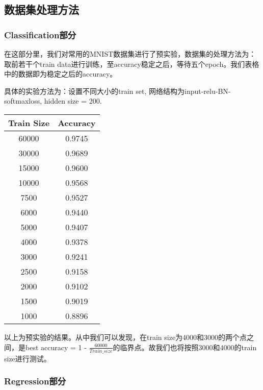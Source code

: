 \documentclass{article}
\begin{document}
\subsection{数据集处理方法}

\subsubsection{Classification部分}

在这部分里，我们对常用的MNIST数据集进行了预实验，数据集的处理方法为：取前若干个train data进行训练，至accuracy稳定之后，等待五个epoch。我们表格中的数据即为稳定之后的accuracy。

具体的实验方法为：设置不同大小的train set, 网络结构为input-relu-BN-softmaxloss, hidden size = 200.

\begin{center}
    \begin{tabular}{|c|c|}
        \hline
        Train Size & Accuracy \\
        \hline
        60000 & 0.9745 \\
        \hline
        30000 & 0.9689 \\
        \hline
        15000 & 0.9600 \\
        \hline
        10000 & 0.9568 \\
        \hline
        7500 & 0.9527 \\
        \hline
        6000 & 0.9440 \\
        \hline
        5000 & 0.9407 \\
        \hline
        4000 & 0.9378 \\
        \hline
        3000 & 0.9241 \\
        \hline
        2500 & 0.9158 \\
        \hline
        2000 & 0.9102 \\
        \hline
        1500 & 0.9019 \\
        \hline
        1000 & 0.8896 \\
        \hline
    \end{tabular}
\end{center}

以上为预实验的结果。从中我们可以发现，在train size为4000和3000的两个点之间，是best accuracy = 1 - $\frac{60000}{Train\_size}$的临界点。故我们也将按照3000和4000的train size进行测试。

\subsubsection{Regression部分}
\end{document}
